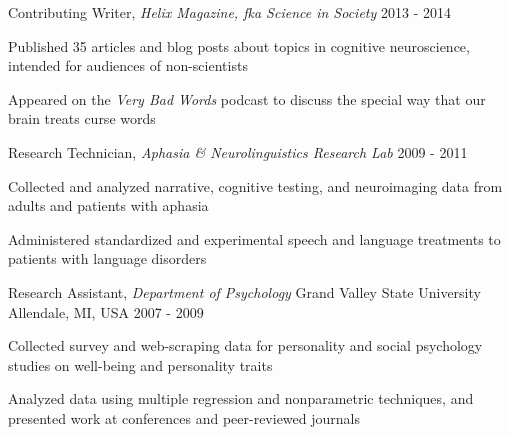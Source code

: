 \begin{cventries}
   \cventry
    {Contributing Writer, \textit{Helix Magazine, fka Science in Society}}
    {}
    {}
    {2013 - 2014}
    {
      \begin{cvitems}
      \item {Published 35 articles and blog posts about topics in cognitive neuroscience, intended for audiences of non-scientists}
      \item {Appeared on the \textit{Very Bad Words} podcast to discuss the special way that our brain treats curse words}
      \end{cvitems}
    }

  \cventry
    {Research Technician, \textit{Aphasia \& Neurolinguistics Research Lab}} %
    {} %
    {} %
    {2009 - 2011} %
    {
      \begin{cvitems} %
        \item {Collected and analyzed narrative, cognitive testing, and neuroimaging data from adults and patients with aphasia}
        \item {Administered standardized and experimental speech and language treatments to patients with language disorders}
      \end{cvitems}
    }

  \cventry
    {Research Assistant, \textit{Department of Psychology}} %
    {Grand Valley State University} %
    {Allendale, MI, USA} %
    {2007 - 2009} %
    {
      \begin{cvitems} %
        \item {Collected survey and web-scraping data for personality and social psychology studies on well-being and personality traits}
        \item {Analyzed data using multiple regression and nonparametric techniques, and presented work at conferences and peer-reviewed journals}
      \end{cvitems}
    }

\end{cventries}
